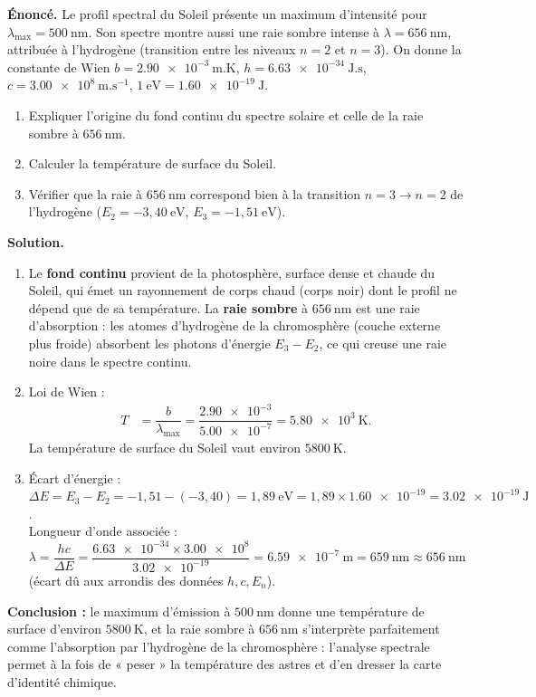 \documentclass[11pt]{article}
\begin{document}
\begin{exoresolu}
\textbf{Énoncé.} Le profil spectral du Soleil présente un maximum d'intensité pour $\lambda_{\max} = 500~\text{nm}$. Son spectre montre aussi une raie sombre intense à $\lambda = 656~\text{nm}$, attribuée à l'hydrogène (transition entre les niveaux $n = 2$ et $n = 3$). On donne la constante de Wien $b = \num{2,90e-3}~\text{m.K}$, $h = \num{6,63e-34}~\text{J.s}$, $c = \num{3,00e8}~\text{m.s}^{-1}$, $1~\text{eV} = \num{1,60e-19}~\text{J}$.
\begin{enumerate}
\item Expliquer l'origine du fond continu du spectre solaire et celle de la raie sombre à $656~\text{nm}$.
\item Calculer la température de surface du Soleil.
\item Vérifier que la raie à $656~\text{nm}$ correspond bien à la transition $n = 3 \rightarrow n = 2$ de l'hydrogène ($E_2 = -3,40~\text{eV}$, $E_3 = -1,51~\text{eV}$).
\end{enumerate}
\tcblower
\textbf{Solution.}
\begin{enumerate}
\item Le \textbf{fond continu} provient de la photosphère, surface dense et chaude du Soleil, qui émet un rayonnement de corps chaud (corps noir) dont le profil ne dépend que de sa température. La \textbf{raie sombre} à $656~\text{nm}$ est une raie d'absorption : les atomes d'hydrogène de la chromosphère (couche externe plus froide) absorbent les photons d'énergie $E_3 - E_2$, ce qui creuse une raie noire dans le spectre continu.
\item Loi de Wien : 
\begin{align*}
T &= \dfrac{b}{\lambda_{\max}} = \dfrac{\num{2,90e-3}}{\num{5,00e-7}} = \num{5,80e3}~\text{K}.
\end{align*}
La température de surface du Soleil vaut environ $\num{5800}~\text{K}$.
\item Écart d'énergie : $\Delta E = E_3 - E_2 = -1,51 - (-3,40) = 1,89~\text{eV} = 1,89 \times \num{1,60e-19} = \num{3,02e-19}~\text{J}$.\\
Longueur d'onde associée : $\lambda = \dfrac{hc}{\Delta E} = \dfrac{\num{6,63e-34} \times \num{3,00e8}}{\num{3,02e-19}} = \num{6,59e-7}~\text{m} = 659~\text{nm} \approx 656~\text{nm}$ (écart dû aux arrondis des données $h, c, E_n$).
\end{enumerate}
\textbf{Conclusion :} le maximum d'émission à $500~\text{nm}$ donne une température de surface d'environ $\num{5800}~\text{K}$, et la raie sombre à $656~\text{nm}$ s'interprète parfaitement comme l'absorption par l'hydrogène de la chromosphère : l'analyse spectrale permet à la fois de « peser » la température des astres et d'en dresser la carte d'identité chimique.
\end{exoresolu}
\end{document}

